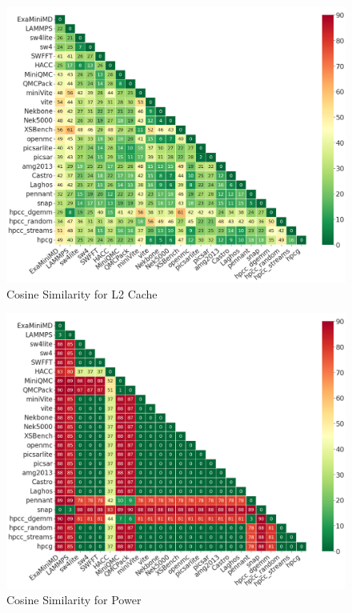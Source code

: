 \documentclass[conference]{IEEEtran}
\begin{document}
\begin{figure}[ht]
\centering
\includegraphics[width=0.9\linewidth]{figs/L2_D_Cache.png}
\caption{Cosine Similarity for L2 Cache }
\label{figs:cosine L2_D_Cache}
\end{figure}



\begin{figure}[ht]
\centering
\includegraphics[width=0.9\linewidth]{figs/Power.png}
\caption{Cosine Similarity for Power }
\label{figs:cosine Power}
\end{figure}
\end{document}

